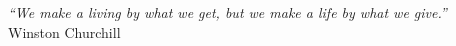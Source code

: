 \cleardoublepage
\thispagestyle{plain}

\vspace*{8cm}

\begin{flushright}
\textsl{``We make a living by what we get, but we make a life by what we give.''} \\
\vspace*{1.5cm}
Winston Churchill
\end{flushright}
